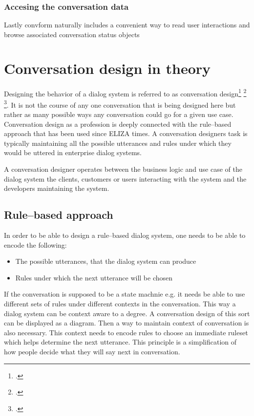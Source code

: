 \documentclass[12pt]{report}
\begin{document}
{\subsubsection{Accesing the conversation data}
Lastly convform naturally includes a convenient way to read user interactions
and browse associated conversation status objects

\section{Conversation design in theory}


\par
Designing the behavior of a dialog system
is referred to as conversation design\footcite{kolosova2022} \footcite{mctear2020conversational} \footcite{cxd}.
It is not the course of any one conversation that is being designed here
but rather as many possible ways any conversation could go
for a given use case.
Conversation design as a profession is deeply connected
with the rule–based approach that has been used since ELIZA times.
A conversation designers task is typically maintaining all the possible utterances and
rules under which they would be uttered
in enterprise dialog systems.

A conversation designer operates between
the business logic and use case of the dialog system
the clients, customers or users interacting with the system
and the developers maintaining the system.

\subsection{Rule–based approach}

In order to be able to design a rule–based dialog system,
one needs to be able to encode the following:

    \begin{itemize}

        \item
        The possible utterances, that the dialog system can produce

        \item
        Rules under which the next utterance will be chosen
    \end{itemize}

\par
If the conversation is supposed to be a state machnie e.g.
it needs be able to use different sets of rules
under different contexts in the conversation.
This way a dialog system can be context aware to a degree.
A conversation design of this sort
can be displayed as a diagram.
Then a way to maintain context of conversation is also necessary.
This context needs to encode rules to choose an immediate ruleset
which helps determine the next utterance.
This principle is a simplification of
how people decide what they will say next in conversation.

}
\end{document}
